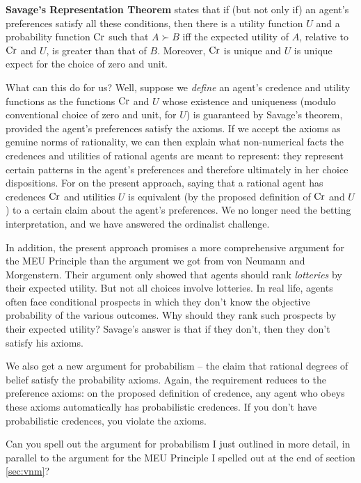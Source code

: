 \textbf{Savage's Representation Theorem} states that if (but not only
if) an agent's preferences satisfy all these conditions, then there is
a utility function $U$ and a probability function $\text{Cr}$ such that $A
\succ B$ iff the expected utility of $A$, relative to $\text{Cr}$ and $U$,
is greater than that of $B$. Moreover, $\text{Cr}$ is unique and $U$ is
unique expect for the choice of zero and unit.

What can this do for us? Well, suppose we \emph{define} an agent's credence
and utility functions as the functions $\text{Cr}$ and $U$ whose existence
and uniqueness (modulo conventional choice of zero and unit, for $U$)
is guaranteed by Savage's theorem, provided the agent's preferences
satisfy the axioms. If we accept the axioms as genuine norms of
rationality, we can then explain what non-numerical facts the
credences and utilities of rational agents are meant to represent:
they represent certain patterns in the agent's preferences and
therefore ultimately in her choice dispositions. For on the present
approach, saying that a rational agent has credences $\text{Cr}$ and
utilities $U$ is equivalent (by the proposed definition of $\text{Cr}$ and
$U$) to a certain claim about the agent's preferences. We no longer
need the betting interpretation, and we have answered the ordinalist challenge.

In addition, the present approach promises a more comprehensive
argument for the MEU Principle than the argument we got from von
Neumann and Morgenstern. Their argument only showed that agents should
rank \emph{lotteries} by their expected utility. But not all choices
involve lotteries. In real life, agents often face conditional
prospects in which they don't know the objective probability of the
various outcomes. Why should they rank such prospects by their
expected utility? Savage's answer is that if they don't, then they
don't satisfy his axioms.

We also get a new argument for probabilism -- the claim that rational
degrees of belief satisfy the probability axioms. Again, the
requirement reduces to the preference axioms: on the proposed
definition of credence, any agent who obeys these axioms automatically
has probabilistic credences. If you don't have probabilistic
credences, you violate the axioms.


\begin{exercise2}
  Can you spell out the argument for probabilism I just outlined in
  more detail, in parallel to the argument for the MEU Principle I
  spelled out at the end of section \ref{sec:vnm}?
\end{exercise2}


